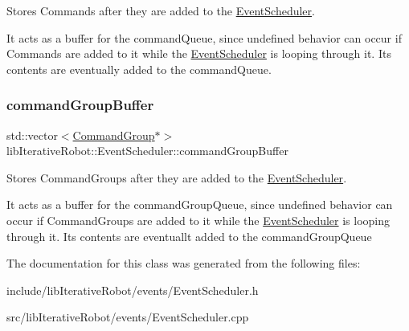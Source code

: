 Stores Commands after they are added to the \mbox{\hyperlink{classlib_iterative_robot_1_1_event_scheduler}{Event\+Scheduler}}. 

It acts as a buffer for the command\+Queue, since undefined behavior can occur if Commands are added to it while the \mbox{\hyperlink{classlib_iterative_robot_1_1_event_scheduler}{Event\+Scheduler}} is looping through it. Its contents are eventually added to the command\+Queue. \mbox{\label{classlib_iterative_robot_1_1_event_scheduler_a37b0c1d9ec0c00e7729bec67ebbd9986}} 
\subsubsection{\texorpdfstring{commandGroupBuffer}{commandGroupBuffer}}
{\footnotesize\ttfamily std\+::vector$<$\mbox{\hyperlink{classlib_iterative_robot_1_1_command_group}{Command\+Group}}$\ast$$>$ lib\+Iterative\+Robot\+::\+Event\+Scheduler\+::command\+Group\+Buffer\hspace{0.3cm}{\ttfamily [private]}}



Stores Command\+Groups after they are added to the \mbox{\hyperlink{classlib_iterative_robot_1_1_event_scheduler}{Event\+Scheduler}}. 

It acts as a buffer for the command\+Group\+Queue, since undefined behavior can occur if Command\+Groups are added to it while the \mbox{\hyperlink{classlib_iterative_robot_1_1_event_scheduler}{Event\+Scheduler}} is looping through it. Its contents are eventuallt added to the command\+Group\+Queue 

The documentation for this class was generated from the following files\+:\begin{DoxyCompactItemize}
\item 
include/lib\+Iterative\+Robot/events/Event\+Scheduler.\+h\item 
src/lib\+Iterative\+Robot/events/Event\+Scheduler.\+cpp\end{DoxyCompactItemize}
